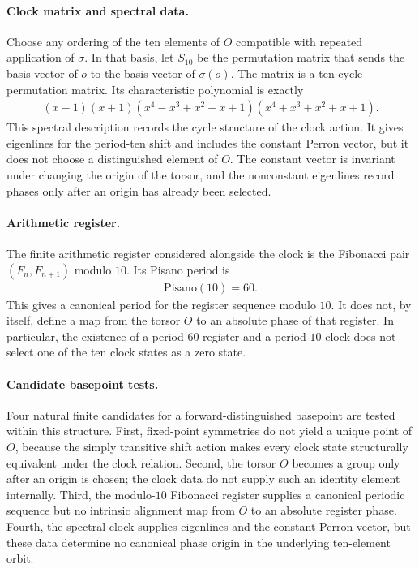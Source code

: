 \paragraph{Clock matrix and spectral data.}
Choose any ordering of the ten elements of $O$ compatible with repeated application of $\sigma$. In that basis, let $S_{10}$ be the permutation matrix that sends the basis vector of $o$ to the basis vector of $\sigma(o)$. The matrix is a ten-cycle permutation matrix. Its characteristic polynomial is exactly
$$
\begin{aligned}
(x-1)(x+1)(x^4-x^3+x^2-x+1)(x^4+x^3+x^2+x+1).
\end{aligned}
$$
This spectral description records the cycle structure of the clock action. It gives eigenlines for the period-ten shift and includes the constant Perron vector, but it does not choose a distinguished element of $O$. The constant vector is invariant under changing the origin of the torsor, and the nonconstant eigenlines record phases only after an origin has already been selected.

\paragraph{Arithmetic register.}
The finite arithmetic register considered alongside the clock is the Fibonacci pair $(F_n,F_{n+1})$ modulo $10$. Its Pisano period is
$$
\begin{aligned}
\mathrm{Pisano}(10)=60.
\end{aligned}
$$
This gives a canonical period for the register sequence modulo $10$. It does not, by itself, define a map from the torsor $O$ to an absolute phase of that register. In particular, the existence of a period-$60$ register and a period-$10$ clock does not select one of the ten clock states as a zero state.

\paragraph{Candidate basepoint tests.}
Four natural finite candidates for a forward-distinguished basepoint are tested within this structure. First, fixed-point symmetries do not yield a unique point of $O$, because the simply transitive shift action makes every clock state structurally equivalent under the clock relation. Second, the torsor $O$ becomes a group only after an origin is chosen; the clock data do not supply such an identity element internally. Third, the modulo-$10$ Fibonacci register supplies a canonical periodic sequence but no intrinsic alignment map from $O$ to an absolute register phase. Fourth, the spectral clock supplies eigenlines and the constant Perron vector, but these data determine no canonical phase origin in the underlying ten-element orbit.

